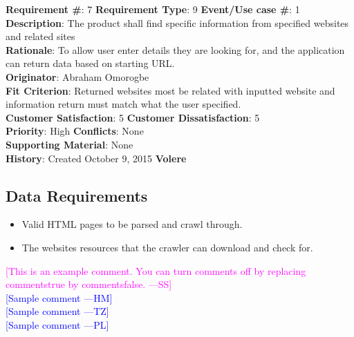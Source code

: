 \documentclass[12pt]{article}
\newcommand{\authornote}[3]{\textcolor{#1}{[#3 ---#2]}}
\newcommand{\authornote}[3]{}
\newcommand{\wss}[1]{\authornote{magenta}{SS}{#1}}
\newcommand{\hm}[1]{\authornote{blue}{HM}{#1}} %
\newcommand{\tz}[1]{\authornote{blue}{TZ}{#1}} %
\newcommand{\pl}[1]{\authornote{blue}{PL}{#1}} %
\begin{document}
\begin{framed}
\textbf{Requirement \#}: 7 \hfill \textbf{Requirement Type}: 9 \hfill\textbf{Event/Use case \#}: 1 \hfill\\
\textbf{Description}:  The product shall find specific information from specified websites and related sites\\
\textbf{Rationale}: To allow user enter details they are looking for, and the application can return data based on starting URL.\\
\textbf{Originator}: Abraham Omorogbe\\
\textbf{Fit Criterion}: Returned websites most be related with inputted website and information return must match what the user specified.\\
\textbf{Customer Satisfaction}: 5 \hfill 	\textbf{Customer Dissatisfaction}: 5 \hfill\\
\textbf{Priority}: High \hfill \textbf{Conflicts}: None \hfill 		\\
\textbf{Supporting Material}: None\\
\textbf{History}: Created October 9, 2015 \hfill	 \textbf{Volere}\hfill

\end{framed}






\subsection{Data Requirements }
\begin{itemize}
  \item Valid HTML pages to be parsed and crawl through.
  \item The websites resources that the crawler can download and check for. 
\end{itemize}


\noindent \wss{This is an example comment.  You can turn comments off by replacing
  commentstrue by commentsfalse.}\\
\hm{Sample comment}\\
\tz{Sample comment}\\
\pl{Sample comment}
\end{document}
